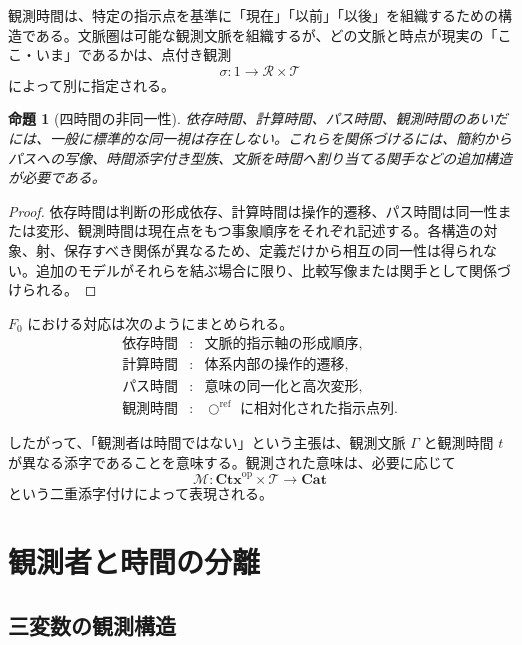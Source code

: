 \documentclass[a4paper,11pt]{ltjsarticle}
\theoremstyle{definition}
\theoremstyle{plain}
\newtheorem{proposition}[definition]{命題}
\newcommand{\CircleRef}{\bigcirc^{\mathrm{ref}}}
\newcommand{\Obj}{\mathcal M}
\newcommand{\Obs}{\mathcal R}
\newcommand{\Time}{\mathcal T}
\newcommand{\op}{\mathrm{op}}
\newcommand{\Ctx}{\mathbf{Ctx}}
\begin{document}
観測時間は、特定の指示点を基準に「現在」「以前」「以後」を組織するための構造である。文脈圏は可能な観測文脈を組織するが、どの文脈と時点が現実の「ここ・いま」であるかは、点付き観測
\begin{equation}
 \sigma:1\longrightarrow\Obs\times\Time
\end{equation}
によって別に指定される。

\begin{proposition}[四時間の非同一性]
依存時間、計算時間、パス時間、観測時間のあいだには、一般に標準的な同一視は存在しない。これらを関係づけるには、簡約からパスへの写像、時間添字付き型族、文脈を時間へ割り当てる関手などの追加構造が必要である。
\end{proposition}

\begin{proof}
依存時間は判断の形成依存、計算時間は操作的遷移、パス時間は同一性または変形、観測時間は現在点をもつ事象順序をそれぞれ記述する。各構造の対象、射、保存すべき関係が異なるため、定義だけから相互の同一性は得られない。追加のモデルがそれらを結ぶ場合に限り、比較写像または関手として関係づけられる。
\end{proof}

$F_0$ における対応は次のようにまとめられる。
\begin{equation}
 \begin{array}{ccl}
 \text{依存時間} &:& \text{文脈的指示軸の形成順序},\\
 \text{計算時間} &:& \text{体系内部の操作的遷移},\\
 \text{パス時間} &:& \text{意味の同一化と高次変形},\\
 \text{観測時間} &:& \CircleRef\text{ に相対化された指示点列}.
 \end{array}
 \label{eq:four-times-f0}
\end{equation}

したがって、「観測者は時間ではない」という主張は、観測文脈 $\Gamma$ と観測時間 $t$ が異なる添字であることを意味する。観測された意味は、必要に応じて
\begin{equation}
 \Obj:\Ctx^{\op}\times\Time\longrightarrow\mathbf{Cat}
 \label{eq:context-time-indexed-meaning}
\end{equation}
という二重添字付けによって表現される。

\section{観測者と時間の分離}

\subsection{三変数の観測構造}
\end{document}
